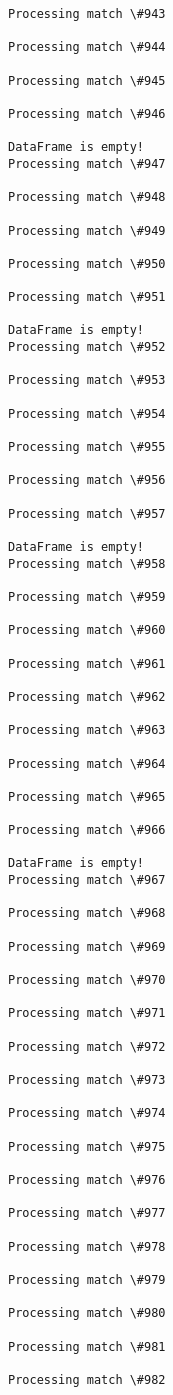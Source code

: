 \documentclass[11pt]{article}
\begin{document}
\begin{Verbatim}[commandchars=\\\{\}]
Processing match \#943

Processing match \#944

Processing match \#945

Processing match \#946

DataFrame is empty!
Processing match \#947

Processing match \#948

Processing match \#949

Processing match \#950

Processing match \#951

DataFrame is empty!
Processing match \#952

Processing match \#953

Processing match \#954

Processing match \#955

Processing match \#956

Processing match \#957

DataFrame is empty!
Processing match \#958

Processing match \#959

Processing match \#960

Processing match \#961

Processing match \#962

Processing match \#963

Processing match \#964

Processing match \#965

Processing match \#966

DataFrame is empty!
Processing match \#967

Processing match \#968

Processing match \#969

Processing match \#970

Processing match \#971

Processing match \#972

Processing match \#973

Processing match \#974

Processing match \#975

Processing match \#976

Processing match \#977

Processing match \#978

Processing match \#979

Processing match \#980

Processing match \#981

Processing match \#982


\end{Verbatim}
\end{document}

